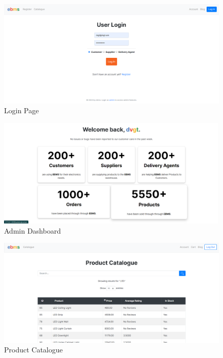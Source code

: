 \divider

\pagebreak

\divider

\begin{figure}[H]
    \includegraphics[width=1.0\textwidth]{./../Assets/login.png}
    \caption{Login Page}
\end{figure}

\divider

\begin{figure}[H]
    \includegraphics[width=1.0\textwidth]{./../Assets/admin-dashboard.png}
    \caption{Admin Dashboard}
\end{figure}

\divider

\pagebreak

\divider

\begin{figure}[H]
    \includegraphics[width=1.0\textwidth]{./../Assets/catalogue.png}
    \caption{Product Catalogue}
\end{figure}

